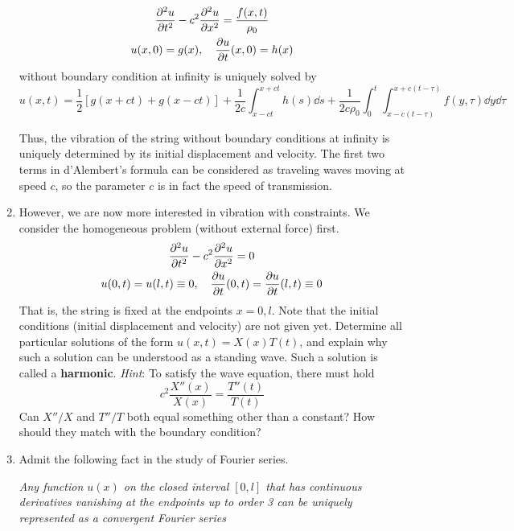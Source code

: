 \documentclass[../psets.tex]{subfiles}
\begin{document}
\begin{enumerate}
\begin{theorem}[d'Alembert]
\begin{gather*}
            \pdv[2]{u}{t}-c^2\pdv[2]{u}{x} = \frac{f(x,t)}{\rho_0}\\
            u(x,0) = g(x)
                ,\quad
                {\pdv{u}{t}}(x,0) = h(x)
        \end{gather*}
        without boundary condition at infinity is uniquely solved by
        \begin{equation*}
            u(x,t) = \frac{1}{2}[g(x+ct)+g(x-ct)]+\frac{1}{2c}\int_{x-ct}^{x+ct}h(s)\dd{s}+\frac{1}{2c\rho_0}\int_0^t\int_{x-c(t-\tau)}^{x+c(t-\tau)}f(y,\tau)\dd{y}\dd\tau
        \end{equation*}
    \end{theorem}
    Thus, the vibration of the string without boundary conditions at infinity is uniquely determined by its initial displacement and velocity. The first two terms in d'Alembert's formula can be considered as traveling waves moving at speed $c$, so the parameter $c$ is in fact the speed of transmission.
    \item However, we are now more interested in vibration with constraints. We consider the homogeneous problem (without external force) first.
    \begin{gather*}
        \pdv[2]{u}{t}-c^2\pdv[2]{u}{x} = 0\\
        u(0,t) = u(l,t) \equiv 0
            ,\quad
            {\pdv{u}{t}}(0,t) = {\pdv{u}{t}}(l,t) \equiv 0
    \end{gather*}
    That is, the string is fixed at the endpoints $x=0,l$. Note that the initial conditions (initial displacement and velocity) are not given yet. Determine all particular solutions of the form $u(x,t)=X(x)T(t)$, and explain why such a solution can be understood as a standing wave. Such a solution is called a \textbf{harmonic}. \emph{Hint}: To satisfy the wave equation, there must hold
    \begin{equation*}
        c^2\frac{X''(x)}{X(x)} = \frac{T''(t)}{T(t)}
    \end{equation*}
    Can $X''/X$ and $T''/T$ both equal something other than a constant? How should they match with the boundary condition?
    \item Admit the following fact in the study of Fourier series.\par
    \begingroup
    \itshape
    Any function $u(x)$ on the closed interval $[0,l]$ that has continuous derivatives vanishing at the endpoints up to order 3 can be uniquely represented as a convergent Fourier series
    \begin{equation*}

\end{equation*}
\end{enumerate}
\end{document}
